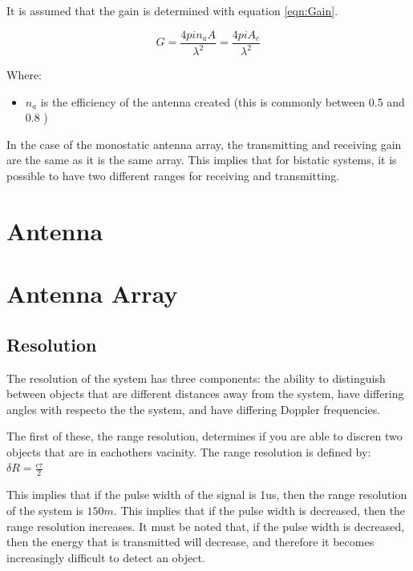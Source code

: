\documentclass[11pt]{witseiepaper}
\begin{document}
It is assumed that the gain is determined with equation \ref{eqn:Gain}.

\begin{equation} \label{eqn:Gain}
G = \frac{4 pi n_{a} A}{\lambda^2} = \frac{4 pi A_{e}}{\lambda^2}
\end{equation}

Where:
\begin{itemize}
    \item $n_{a}$ is the efficiency of the antenna created (this is commonly between 0.5 and 0.8 \cite[p.~64]{radarHandbook})
\end{itemize}

In the case of the monostatic antenna array, the transmitting and receiving gain are the same as it is the same array. This implies that for bistatic systems, it is possible to have two different ranges for receiving and transmitting.


\section{Antenna}

\section{Antenna Array} \label{sec:AntennaArray}


\subsection{Resolution} \label{sec:Resolution}

The resolution of the system has three components: the ability to distinguish between objects that are different distances away from the system, have differing angles with respecto the the system, and have differing Doppler frequencies.

The first of these, the range resolution, determines if you are able to discren two objects that are in eachothers vacinity.
The range resolution is defined by:
$\delta R = \frac{c \tau}{2}$

This implies that if the pulse width of the signal is 1us, then the range resolution of the system is $150 m$. This implies that if the pulse width is decreased, then the range resolution increases.
It must be noted that, if the pulse width is decreased, then the energy that is transmitted will decrease, and therefore it becomes increasingly difficult to detect an object.

\end{document}
